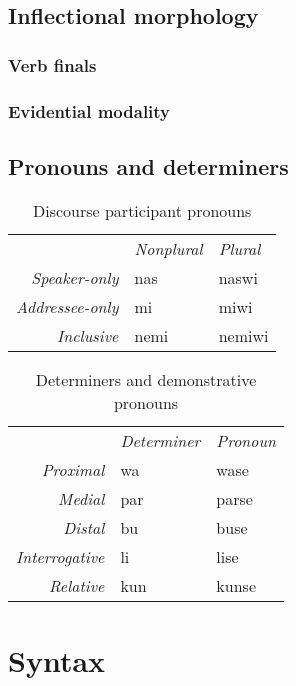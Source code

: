 \documentclass[a4paper,10pt,twoside,openright]{memoir}
\begin{document}
\section{Inflectional morphology}

\subsection{Verb finals}

\subsection{Evidential modality}

\section{Pronouns and determiners}

\begin{table}[ht]
    \centering
    \begin{tabular}{rll}
        & \textit{Nonplural} & \textit{Plural} \\
    \textit{Speaker-only} & nas & naswi \\
    \textit{Addressee-only} & mi & miwi \\
    \textit{Inclusive} & nemi & nemiwi \\
    \end{tabular}
    \caption{Discourse participant pronouns}
    \label{tab:firstandsecond}
\end{table}

\begin{table}[ht]
    \centering
    \begin{tabular}{>{\em}rll}
        & \textit{Determiner} & \textit{Pronoun}  \\
    Proximal & wa & wase \\
    Medial & par & parse \\
    Distal & bu & buse \\
    Interrogative & li & lise \\
    Relative & kun & kunse 
    \end{tabular}
    \caption{Determiners and demonstrative pronouns}
    \label{tab:determiners}
\end{table}

\chapter{Syntax}
\end{document}
